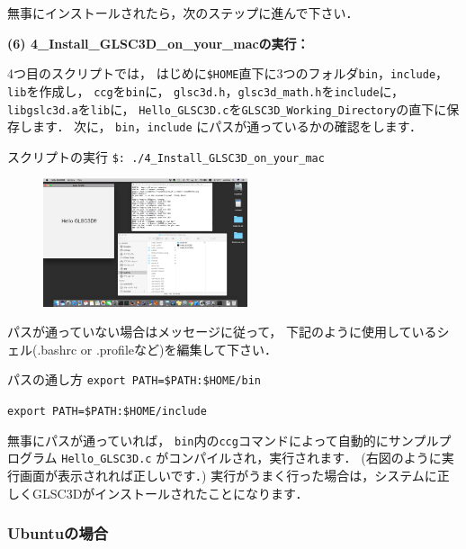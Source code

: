 \documentclass[platex,a4paper,12pt]{jsarticle}%
\begin{document}
無事にインストールされたら，次のステップに進んで下さい．

\noindent 
{\bf (6) 4\_Install\_GLSC3D\_on\_your\_macの実行：} 

4つ目のスクリプトでは，
はじめに\verb|$HOME|直下に3つのフォルダ\verb|bin|，\verb|include|，\verb|lib|を作成し，
\verb|ccg|を\verb|bin|に，
\verb|glsc3d.h|，\verb|glsc3d_math.h|を\verb|include|に，
\verb|libgslc3d.a|を\verb|lib|に，
\verb|Hello_GLSC3D.c|を\verb|GLSC3D_Working_Directory|の直下に保存します．
次に，
\verb|bin|，\verb|include|
にパスが通っているかの確認をします．

\begin{itembox}[l]{スクリプトの実行}
\verb|$: ./4_Install_GLSC3D_on_your_mac|
\end{itembox}

\begin{figure}
\includegraphics[width=60mm]{./Figures/eps/Canvas_Hello_GLSD3D.eps}
\vspace{-4\baselineskip}
\end{figure}

パスが通っていない場合はメッセージに従って，
下記のように使用しているシェル(.bashrc or .profileなど)を編集して下さい．

\begin{itembox}[l]{パスの通し方}
\verb|export PATH=$PATH:$HOME/bin|
	
\verb|export PATH=$PATH:$HOME/include|
\end{itembox}

無事にパスが通っていれば，
\verb|bin|内の\verb|ccg|コマンドによって自動的にサンプルプログラム \verb|Hello_GLSC3D.c| がコンパイルされ，実行されます．
(右図のように実行画面が表示されれば正しいです．)
実行がうまく行った場合は，システムに正しくGLSC3Dがインストールされたことになります．

\subsubsection{Ubuntuの場合}
\end{document}
